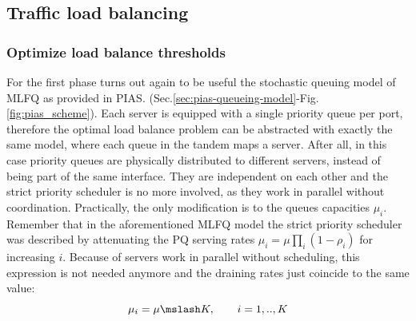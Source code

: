 \subsection{Traffic load balancing}
\label{sec:decoupling}
\subsubsection{Optimize load balance thresholds}
\label{sec:optimal-lb-problem}
For the first phase turns out again to be useful the stochastic queuing model of MLFQ as provided in PIAS. (Sec.\ref{sec:pias-queueing-model}-Fig.\ref{fig:pias_scheme}). Each server is equipped with a single priority queue per port, therefore the optimal load balance problem can be abstracted with exactly the same model, where each queue in the tandem maps a server. After all, in this case priority queues are physically distributed to different servers, instead of being part of the same interface. They are independent on each other and the strict priority scheduler is no more involved, as they work in parallel without coordination. Practically, the only modification is to the queues capacities $\mu_i$. Remember that in the aforementioned MLFQ model the strict priority scheduler was described by attenuating the PQ serving rates $\mu_i = \mu\prod_{i}(1-\rho_i)$ for increasing $i$. Because of servers work in parallel without scheduling, this expression is not needed anymore and the draining rates just coincide to the same value:
\[
\mu_i = \mu \mslash K, \qquad i=1,..,K
\]
